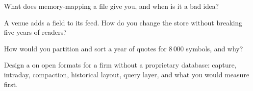 \begin{interviewq}\label{iq:pl:a-tick-store-on-open-formats:3}
What does memory-mapping a file give you, and when is it a bad idea?
\end{interviewq}

\begin{interviewq}\label{iq:pl:a-tick-store-on-open-formats:4}
A venue adds a field to its feed. How do you change the store without breaking five years of readers?
\end{interviewq}

\begin{interviewq}\label{iq:pl:a-tick-store-on-open-formats:5}
How would you partition and sort a year of quotes for 8\,000 symbols, and why?
\end{interviewq}

\begin{interviewq}\label{iq:pl:a-tick-store-on-open-formats:6}
Design a  on open formats for a firm without a proprietary database: capture, intraday, compaction, historical layout,
query layer, and what you would measure first.
\end{interviewq}
